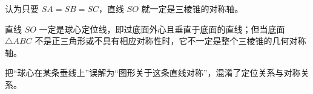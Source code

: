 \begin{trapbox}
	\medskip
	\begin{description}[style=nextline, leftmargin=2.8em, labelsep=0.5em, itemsep=0.35em]
		\item[\textbf{\textcolor{CTrap}{易错点四（对称轴误解）}}] 认为只要 $SA=SB=SC$，直线 $SO$ 就一定是三棱锥的对称轴。
		\item[\textbf{\textcolor{CTrap}{正确理解（定位线而非必然对称轴）：}}] 直线 $SO$ 一定是球心定位线，即过底面外心且垂直于底面的直线；但当底面 $\triangle ABC$ 不是正三角形或不具有相应对称性时，它不一定是整个三棱锥的几何对称轴。
		\item[\textbf{\textcolor{CTrap}{错因分析（概念混用）：}}] 把“球心在某条垂线上”误解为“图形关于这条直线对称”，混淆了定位关系与对称关系。
	\end{description}
\end{trapbox}